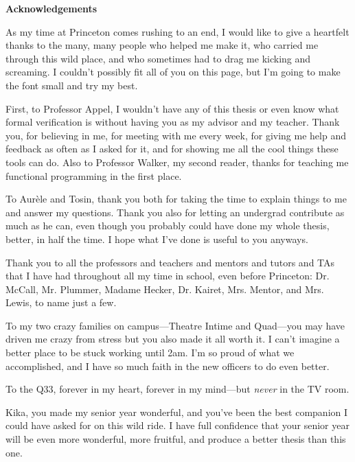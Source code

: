 \documentclass[12pt]{article}
\begin{document}
\clearpage

\begin{center}
    \LARGE \textbf{Acknowledgements}
\end{center}

\begin{singlespace}
\small
\setlength{\parskip}{0.7em}
As my time at Princeton comes rushing to an end, I would like to give a heartfelt thanks to the many, many people who helped me make it, who carried me through this wild place, and who sometimes had to drag me kicking and screaming. I couldn’t possibly fit all of you on this page, but I’m going to make the font small and try my best.

First, to Professor Appel, I wouldn’t have any of this thesis or even know what formal verification is without having you as my advisor and my teacher. Thank you, for believing in me, for meeting with me every week, for giving me help and feedback as often as I asked for it, and for showing me all the cool things these tools can do. Also to Professor Walker, my second reader, thanks for teaching me functional programming in the first place.

To Aurèle and Tosin, thank you both for taking the time to explain things to me and answer my questions. Thank you also for letting an undergrad contribute as much as he can, even though you probably could have done my whole thesis, better, in half the time. I hope what I’ve done is useful to you anyways.

Thank you to all the professors and teachers and mentors and tutors and TAs that I have had throughout all my time in school, even before Princeton: Dr. McCall, Mr. Plummer, Madame Hecker, Dr. Kairet, Mrs. Mentor, and Mrs. Lewis, to name just a few.

To my two crazy families on campus---Theatre Intime and Quad---you may have driven me crazy from stress but you also made it all worth it. I can’t imagine a better place to be stuck working until 2am. I’m so proud of what we accomplished, and I have so much faith in the new officers to do even better.

To the Q33, forever in my heart, forever in my mind---but \textit{never} in the TV room.

Kika, you made my senior year wonderful, and you’ve been the best companion I could have asked for on this wild ride. I have full confidence that your senior year will be even more wonderful, more fruitful, and produce a better thesis than this one.


\end{singlespace}
\end{document}
